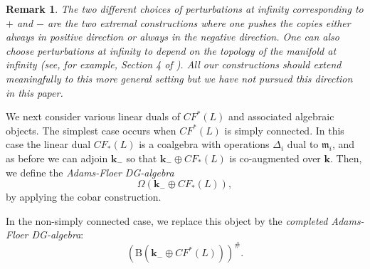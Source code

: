 \documentclass{gtpart}
\newtheorem{rem}[thm]{Remark}
\renewcommand{\k}{\mathbf{k}}
\newcommand{\m}{\mathfrak{m}}
\renewcommand{\Bar}{\mathrm{B}}
\renewcommand{\co}{\mathrm{co}}
\begin{document}
\begin{rem} The two different choices of perturbations at infinity corresponding to $+$ and $-$ are
    the two extremal constructions where one pushes the copies either always in positive direction or
    always in the negative direction. One can also choose perturbations at infinity to depend on the
    topology of the manifold at infinity (see, for example, Section 4 of
    \cite{abouzaid}). All our constructions should extend meaningfully to this more
    general setting but we have not pursued this direction in this paper.
\end{rem} 



We next consider various linear duals of $CF^{\ast}(L)$ and associated algebraic objects. The
simplest case occurs when $CF^{\ast}(L)$ is simply connected. In this case the linear dual
$CF_{\ast}(L)$ is a coalgebra with operations $\Delta_{i}$ dual to $\m_{i}$, and as before we can
adjoin $\k_-$ so that $\k_- \oplus CF_*(L)$ is co-augmented over $\k$. Then, we define the  
\emph{Adams-Floer DG-algebra}
\[ 
\Omega (\k_{-} \oplus CF_*(L)),
\]
by applying the cobar construction.

In the non-simply connected case, we replace this object by the \emph{completed Adams-Floer DG-algebra}: 
\[
(\Bar (\k_{-} \oplus CF^*(L)))^\#.
\]


%

\end{document}
